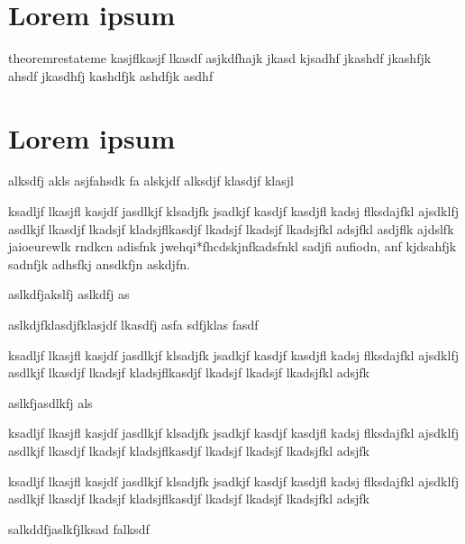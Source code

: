 \documentclass[tikz]{nmd-article}
\begin{document}
\section{Lorem ipsum}

\lipsum[1-5]

\begin{restatable}{theorem}{restateme}
  kasjflkasjf lkasdf asjkdfhajk jkasd kjsadhf jkashdf jkashfjk ahsdf
  jkasdhfj kashdfjk ashdfjk asdhf 
\end{restatable}

\lipsum[6]

\section{Lorem ipsum}

alksdfj akls asjfahsdk fa alskjdf alksdjf klasdjf klasjl

\begin{theorem}
  ksadljf lkasjfl kasjdf jasdlkjf klsadjfk jsadkjf kasdjf kasdjfl
  kadsj flksdajfkl ajsdklfj asdlkjf lkasdjf lkadsjf kladsjflkasdjf
  lkadsjf lkadsjf lkadsjfkl adsjfkl asdjflk ajdslfk jaioeurewlk rndkcn
  adisfnk jwehqi*fhcdskjnfkadsfnkl sadjfi aufiodn, anf kjdsahfjk
  sadnfjk adhsfkj ansdkfjn askdjfn.
\end{theorem}

\restateme

aslkdfjakslfj aslkdfj as 

\restateme

aslkdjfklasdjfklasjdf lkasdfj
asfa sdfjklas fasdf
 

\restateme


\begin{theorem}
  ksadljf lkasjfl kasjdf jasdlkjf klsadjfk jsadkjf kasdjf kasdjfl
  kadsj flksdajfkl ajsdklfj asdlkjf lkasdjf lkadsjf kladsjflkasdjf
  lkadsjf lkadsjf lkadsjfkl adsjfk
\end{theorem}

aslkfjasdlkfj als

\begin{theorem}
  ksadljf lkasjfl kasjdf jasdlkjf klsadjfk jsadkjf kasdjf kasdjfl
  kadsj flksdajfkl ajsdklfj asdlkjf lkasdjf lkadsjf kladsjflkasdjf
  lkadsjf lkadsjf lkadsjfkl adsjfk
\end{theorem}

\begin{theorem}
  ksadljf lkasjfl kasjdf jasdlkjf klsadjfk jsadkjf kasdjf kasdjfl
  kadsj flksdajfkl ajsdklfj asdlkjf lkasdjf lkadsjf kladsjflkasdjf
  lkadsjf lkadsjf lkadsjfkl adsjfk
\end{theorem}

salkddfjaslkfjlksad falksdf 

\restateme

\lipsum[6-15]
\end{document}
